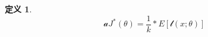 \documentclass{article}
\newtheorem{definition}{\indent 定义}[section]
\begin{document}
	\begin{definition}
		\begin{equation}
		\mathcal{a} J^\ast(\theta) = \frac{1}{k} * E[ \mathcal{l} (x;\theta)]
		\end{equation}
	\end{definition}
\end{document}
